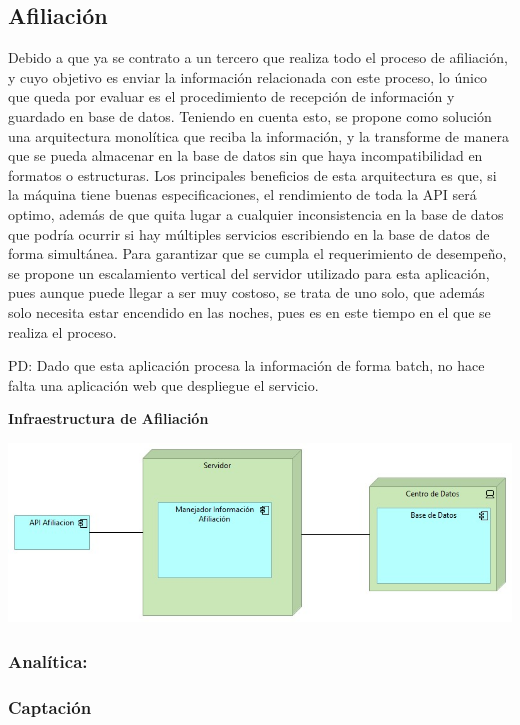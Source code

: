\documentclass[a4paper]{article}
\begin{document}
\subsection{Afiliación}
Debido a que ya se contrato a un tercero que realiza todo el proceso de afiliación, y cuyo objetivo es enviar la información relacionada con este proceso, lo único que queda por evaluar es el procedimiento de recepción de información y guardado en base de datos. Teniendo en cuenta esto, se propone como solución una arquitectura monolítica que reciba la información, y la transforme de manera que se pueda almacenar en la base de datos sin que haya incompatibilidad en formatos o estructuras. Los principales beneficios de esta arquitectura es que, si la máquina tiene buenas especificaciones, el rendimiento de toda la API será optimo, además de que quita lugar a cualquier inconsistencia en la base de datos que podría ocurrir si hay múltiples servicios escribiendo en la base de datos de forma simultánea. Para garantizar que se cumpla el requerimiento de desempeño, se propone un escalamiento vertical del servidor utilizado para esta aplicación, pues aunque puede llegar a ser muy costoso, se trata de uno solo, que además solo necesita estar encendido en las noches, pues es en este tiempo en el que se realiza el proceso.

PD: Dado que esta aplicación procesa la información de forma batch, no hace falta una aplicación web que despliegue el servicio.
\begin{center}
    \textbf{Infraestructura de Afiliación}

    \includegraphics[scale=0.5]{afiliacion.jpeg}
\end{center}


\subsubsection{Analítica:}

\subsubsection{Captación}
\end{document}
